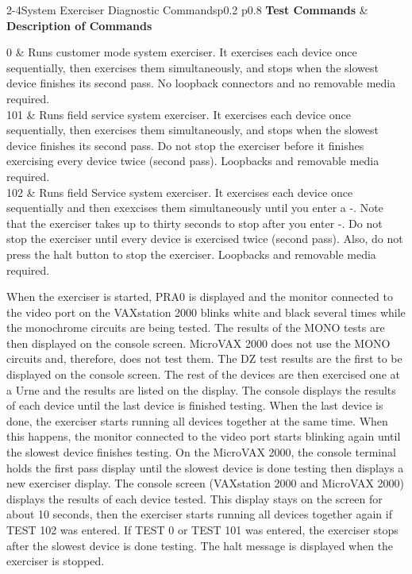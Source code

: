 \begin{tbl}{2-4}{System Exerciser Diagnostic Commands}{p{0.2\textwidth} p{0.8\textwidth}}
\textbf{Test Commands} 	&	\textbf{Description of Commands} \\
\hline

0						&	Runs customer mode system exerciser. It exercises 
							each device once sequentially, then exercises them 
							simultaneously, and stops when the slowest device
							finishes its second pass. No loopback connectors 
							and no removable media required. \\

101						&	Runs field service system exerciser. It exercises 
							each device once sequentially, then exercises them 
							simultaneously, and stops when the slowest device 
							finishes its second pass. Do not stop the exerciser 
							before it finishes exercising every device twice 
							(second pass). Loopbacks and removable media required. \\

102						&	Runs field Service system exerciser. It exercises each 
							device once sequentially and then exexcises them 
							simultaneously until you enter a -. 
							Note that the exerciser takes up to thirty seconds 
							to stop after you enter -. Do
							not stop the exerciser until every device is exercised 
							twice (second pass). Also, do not press the halt button 
							to stop the exerciser. Loopbacks and removable media required. \\
\end{tbl}

When the exerciser is started, PRA0 is displayed and the monitor connected
to the video port on the VAXstation 2000 blinks white and black several
times while the monochrome circuits are being tested. The results of the
MONO tests are then displayed on the console screen. MicroVAX 2000
does not use the MONO circuits and, therefore, does not test them. The
DZ test results are the first to be displayed on the console screen. The rest
of the devices are then exercised one at a Urne and the results are listed
on the display. The console displays the results of each device until the
last device is finished testing. When the last device is done, the exerciser
starts running all devices together at the same time. When this happens, the
monitor connected to the video port starts blinking again until the slowest
device finishes testing. On the MicroVAX 2000, the console terminal holds
the first pass display until the slowest device is done testing then displays a
new exerciser display. The console screen (VAXstation 2000 and MicroVAX
2000) displays the results of each device tested. This display stays on the
screen for about 10 seconds, then the exerciser starts running all devices
together again if TEST 102 was entered. If TEST 0 or TEST 101 was entered,
the exerciser stops after the slowest device is done testing. The halt message
is displayed when the exerciser is stopped.

